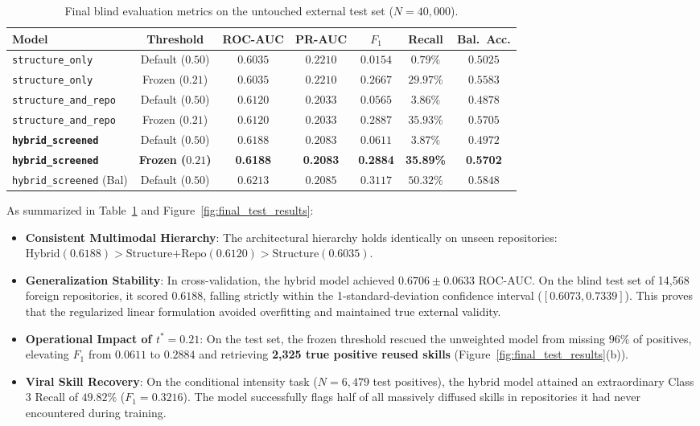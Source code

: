 \documentclass[12pt]{article}
\begin{document}
\begin{table}[ht]
\centering
\caption{Final blind evaluation metrics on the untouched external test set ($N=40,000$).}
\label{tab:final_test_binary}
\small
\begin{tabular}{lcccccc}
\toprule
\textbf{Model} & \textbf{Threshold} & \textbf{ROC-AUC} & \textbf{PR-AUC} & \textbf{$F_1$} & \textbf{Recall} & \textbf{Bal.~Acc.} \\
\midrule
\texttt{structure\_only} & Default ($0.50$) & $0.6035$ & $0.2210$ & $0.0154$ & $0.79\%$ & $0.5025$ \\
\texttt{structure\_only} & Frozen ($0.21$) & $0.6035$ & $0.2210$ & $0.2667$ & $29.97\%$ & $0.5583$ \\
\texttt{structure\_and\_repo} & Default ($0.50$) & $0.6120$ & $0.2033$ & $0.0565$ & $3.86\%$ & $0.4878$ \\
\texttt{structure\_and\_repo} & Frozen ($0.21$) & $0.6120$ & $0.2033$ & $0.2887$ & $35.93\%$ & $0.5705$ \\
\textbf{\texttt{hybrid\_screened}} & Default ($0.50$) & $0.6188$ & $0.2083$ & $0.0611$ & $3.87\%$ & $0.4972$ \\
\textbf{\texttt{hybrid\_screened}} & \textbf{Frozen ($0.21$)} & \textbf{0.6188} & \textbf{0.2083} & \textbf{0.2884} & \textbf{35.89\%} & \textbf{0.5702} \\
\texttt{hybrid\_screened} (Bal) & Default ($0.50$) & $0.6213$ & $0.2085$ & $0.3117$ & $50.32\%$ & $0.5848$ \\
\bottomrule
\end{tabular}
\end{table}

As summarized in Table~\ref{tab:final_test_binary} and Figure~\ref{fig:final_test_results}:
\begin{itemize}
    \item \textbf{Consistent Multimodal Hierarchy}: The architectural hierarchy holds identically on unseen repositories: $\text{Hybrid} (0.6188) > \text{Structure+Repo} (0.6120) > \text{Structure} (0.6035)$.
    \item \textbf{Generalization Stability}: In cross-validation, the hybrid model achieved $0.6706 \pm 0.0633$ ROC-AUC. On the blind test set of 14,568 foreign repositories, it scored $\mathbf{0.6188}$, falling strictly within the 1-standard-deviation confidence interval ($[0.6073, 0.7339]$). This proves that the regularized linear formulation avoided overfitting and maintained true external validity.
    \item \textbf{Operational Impact of $t^*=0.21$}: On the test set, the frozen threshold rescued the unweighted model from missing $96\%$ of positives, elevating $F_1$ from $0.0611$ to $\mathbf{0.2884}$ and retrieving \textbf{2,325 true positive reused skills} (Figure~\ref{fig:final_test_results}(b)).
    \item \textbf{Viral Skill Recovery}: On the conditional intensity task ($N=6,479$ test positives), the hybrid model attained an extraordinary Class 3 Recall of $\mathbf{49.82\%}$ ($F_1 = 0.3216$). The model successfully flags half of all massively diffused skills in repositories it had never encountered during training.
\end{itemize}
\end{document}
